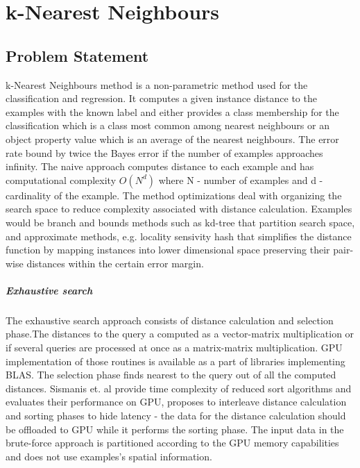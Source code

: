 \chapter{k-Nearest Neighbours}

\section*{Problem Statement}
 
k-Nearest Neighbours method is a non-parametric method used for the classification and regression. It computes a given instance distance to the examples with the known label and either provides a class membership for the classification which is a class most common among nearest neighbours or an object property value which is an average of the nearest neighbours. 
The error rate bound by twice the Bayes error if the number of examples approaches infinity.
The naive approach computes distance to each example and has computational complexity  $ O(N^{d}) $ where N - number of examples and d - cardinality of the example.
The method optimizations deal with organizing the search space to reduce
complexity associated with distance calculation. Examples would be branch
and bounds methods such as kd-tree that partition search space, and approximate
methods, e.g. locality sensivity hash that simplifies the distance function by
mapping instances into lower dimensional space preserving their pair-wise distances within the certain error margin. 

\paragraph*{Exhaustive search} 
The exhaustive search approach consists of distance
calculation and selection phase.The distances to the query a computed as a
vector-matrix multiplication or if several queries are processed at once as a
matrix-matrix multiplication. GPU implementation of those routines is available
as a part of libraries implementing BLAS\cite{cuBLAS}\cite{clBlas}\cite{ViennaCL}. The selection phase finds nearest to the query out of all the computed distances. Sismanis et.
al\cite{Sismanis2012} provide time complexity of reduced sort algorithms and evaluates their performance on GPU, proposes to interleave distance calculation and sorting phases to hide latency - the data for the distance calculation should be offloaded to GPU while it performs the sorting phase. The input data in the brute-force approach is partitioned according to the GPU memory capabilities and does not use examples's spatial information.

